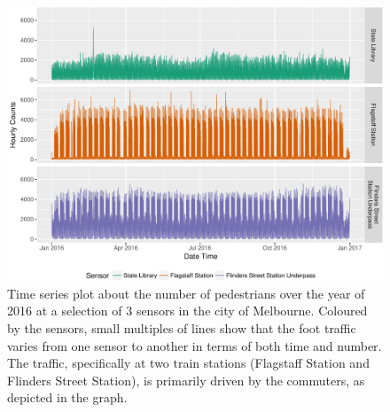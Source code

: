\documentclass[article]{jss}
\begin{document}
\begin{CodeChunk}
\begin{figure}

{\centering \includegraphics[width=\textwidth]{figure/time-series-plot-1} 

}

\caption[Time series plot about the number of pedestrians over the year of 2016 at a selection of 3 sensors in the city of Melbourne]{Time series plot about the number of pedestrians over the year of 2016 at a selection of 3 sensors in the city of Melbourne. Coloured by the sensors, small multiples of lines show that the foot traffic varies from one sensor to another in terms of both time and number. The traffic, specifically at two train stations (Flagstaff Station and Flinders Street Station), is primarily driven by the commuters, as depicted in the graph.}\label{fig:time-series-plot}
\end{figure}
\end{CodeChunk}
\end{document}
